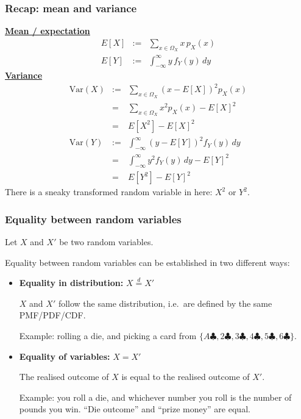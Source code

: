 \documentclass[t,8pt]{beamer}
\begin{document}
\begin{frame}
	\frametitle{Recap: mean and variance}
	{\bf\underline{Mean / expectation}}
	\begin{eqnarray*}
		E[X]&:=&\sum_{x\in\Omega_X} x\,p_X(x)\\
		E[Y]&:=&\int_{-\infty}^{\infty} y\,f_Y(y)\,dy
	\end{eqnarray*}
	{\bf\underline{Variance}}
	\begin{eqnarray*}
		\mathrm{Var}(X)&:=&\sum_{x\in\Omega_X} (x-E[X])^2 p_X(x)\\
		&=&\sum_{x\in\Omega_X} x^2 p_X(x)-E[X]^2\\
		&=&E[X^2]-E[X]^2\\[3pt]
		\mathrm{Var}(Y)&:=&\int_{-\infty}^{\infty} (y-E[Y])^2 f_Y(y)\,dy\\
		&=&\int_{-\infty}^{\infty} y^2 f_Y(y)\,dy - E[Y]^2\\
		&=&E[Y^2]-E[Y]^2
	\end{eqnarray*}
	{\small\color{NavyBlue} There is a sneaky transformed random variable in here: $X^2$ or $Y^2$.}
\end{frame}

\begin{frame}
	\frametitle{Equality between random variables}
	Let $X$ and $X'$ be two random variables. \par
	Equality between random variables can be established in two different ways:
	\begin{itemize}
		\item {\bf Equality in distribution:} $X\stackrel{d}{=}X'$ \par
		$X$ and $X'$ follow the same distribution, i.e.\ are defined by the same PMF/PDF/CDF. \par
		Example: rolling a die, and picking a card from $\{A\clubsuit,2\clubsuit,3\clubsuit,4\clubsuit,5\clubsuit,6\clubsuit\}$.
		\item {\bf Equality of variables:} $X=X'$ \par
		The realised outcome of $X$ is equal to the realised outcome of $X'$. \par
		Example: you roll a die, and whichever number you roll is the number of pounds you win. ``Die outcome'' and ``prize money'' are equal.
	\end{itemize}
\end{frame}
\end{document}
